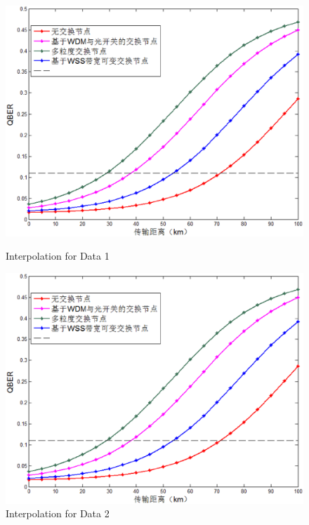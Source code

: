 \documentclass[letterpaper,10pt]{article}
\begin{document}
\begin{figure}[!htb]
   \begin{minipage}{0.48\textwidth}
     \centering
     \includegraphics[width=.7\linewidth]{distance_of_transmission}
     \caption{Interpolation for Data 1}\label{Fig:Data1}
   \end{minipage}\hfill
   \begin{minipage}{0.48\textwidth}
     \centering
     \includegraphics[width=.7\linewidth]{distance_of_transmission}
     \caption{Interpolation for Data 2} \label{tbl:excel-table}
   \end{minipage}
\end{figure}
\end{document}
